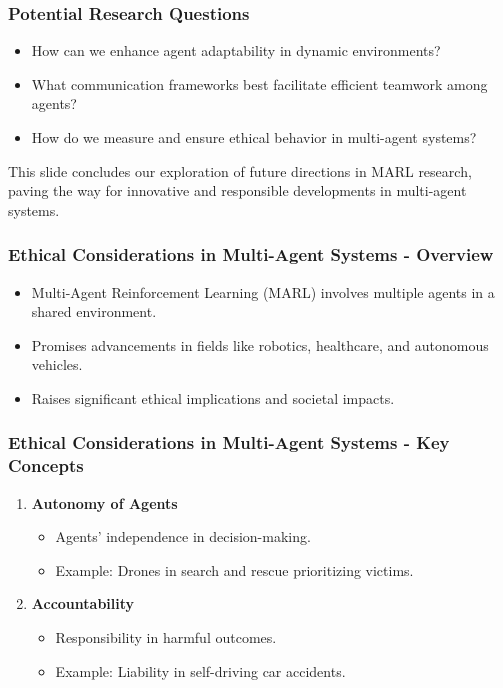 \documentclass[aspectratio=169]{beamer}
\begin{document}
\begin{frame}[fragile]
    \frametitle{Potential Research Questions}
    \begin{itemize}
        \item How can we enhance agent adaptability in dynamic environments?
        \item What communication frameworks best facilitate efficient teamwork among agents?
        \item How do we measure and ensure ethical behavior in multi-agent systems?
    \end{itemize}
    This slide concludes our exploration of future directions in MARL research, paving the way for innovative and responsible developments in multi-agent systems.
\end{frame}

\begin{frame}[fragile]
  \frametitle{Ethical Considerations in Multi-Agent Systems - Overview}
  \begin{itemize}
    \item Multi-Agent Reinforcement Learning (MARL) involves multiple agents in a shared environment.
    \item Promises advancements in fields like robotics, healthcare, and autonomous vehicles.
    \item Raises significant ethical implications and societal impacts.
  \end{itemize}
\end{frame}

\begin{frame}[fragile]
  \frametitle{Ethical Considerations in Multi-Agent Systems - Key Concepts}
  \begin{enumerate}
    \item \textbf{Autonomy of Agents}
      \begin{itemize}
        \item Agents' independence in decision-making.
        \item Example: Drones in search and rescue prioritizing victims.
      \end{itemize}
    \item \textbf{Accountability}
      \begin{itemize}
        \item Responsibility in harmful outcomes.
        \item Example: Liability in self-driving car accidents.
      \end{itemize}
  \end{enumerate}
\end{frame}
\end{document}
